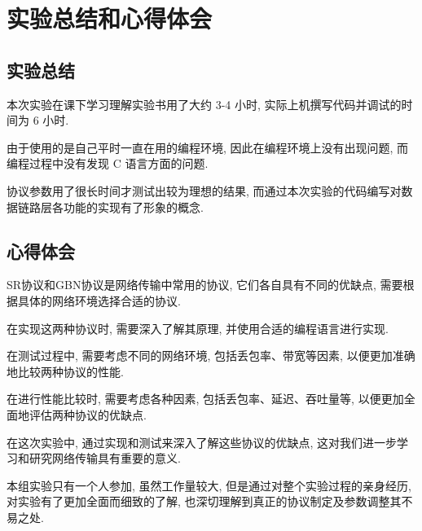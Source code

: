 \section{实验总结和心得体会}

\subsection{实验总结}

\par 本次实验在课下学习理解实验书用了大约 3-4 小时, 实际上机撰写代码并调试的时间为 6 小时.
\par 由于使用的是自己平时一直在用的编程环境, 因此在编程环境上没有出现问题, 而编程过程中没有发现 C 语言方面的问题.
\par 协议参数用了很长时间才测试出较为理想的结果, 而通过本次实验的代码编写对数据链路层各功能的实现有了形象的概念.

\subsection{心得体会}

\par SR协议和GBN协议是网络传输中常用的协议, 它们各自具有不同的优缺点, 需要根据具体的网络环境选择合适的协议.

\par 在实现这两种协议时, 需要深入了解其原理, 并使用合适的编程语言进行实现.

\par 在测试过程中, 需要考虑不同的网络环境, 包括丢包率、带宽等因素, 以便更加准确地比较两种协议的性能.

\par 在进行性能比较时, 需要考虑各种因素, 包括丢包率、延迟、吞吐量等, 以便更加全面地评估两种协议的优缺点.

\par 在这次实验中, 通过实现和测试来深入了解这些协议的优缺点, 这对我们进一步学习和研究网络传输具有重要的意义.

\par 本组实验只有一个人参加, 虽然工作量较大, 但是通过对整个实验过程的亲身经历, 对实验有了更加全面而细致的了解, 也深切理解到真正的协议制定及参数调整其不易之处.
